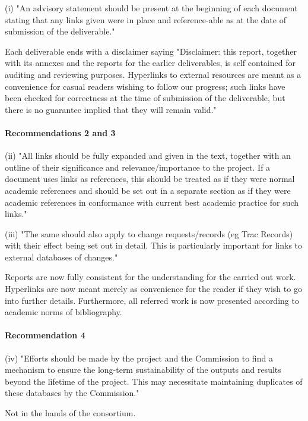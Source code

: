 \documentclass{deliverablereport}
\begin{document}
(i) "An advisory statement should be present at the beginning of each document stating that any links given were in 
place and reference-able as at the date of submission of the deliverable."

Each deliverable ends with a disclaimer saying "Disclaimer: this report, together with its annexes and the reports for the earlier deliverables,
is self contained for auditing and reviewing purposes. Hyperlinks to external resources are
meant as a convenience for casual readers wishing to follow our progress; such links have
been checked for correctness at the time of submission of the deliverable, but there is no
guarantee implied that they will remain valid."


\paragraph{Recommendations 2 and 3}

(ii) "All links should be fully expanded and given in the text, together with an outline of their significance and 
relevance/importance to the project. If a document uses links as references, this should be treated as if they were 
normal academic references and should be set out in a separate section as if they were academic references in 
conformance with current best academic practice for such links."

(iii) "The same should also apply to change requests/records (eg Trac Records) with their effect being set out in detail. 
This is particularly important for links to external databases of changes."

Reports are now fully consistent for the understanding for the carried out work. Hyperlinks are now meant merely
as convenience for the reader if they wish to go into further details. Furthermore, all referred work is now presented according
to academic norms of bibliography.

\paragraph{Recommendation 4}
(iv) "Efforts should be made by the project and the Commission to find a mechanism to ensure the long-term 
sustainability of the outputs and results beyond the lifetime of the project. This may necessitate maintaining 
duplicates of these databases by the Commission."

Not in the hands of the consortium.

\end{document}
